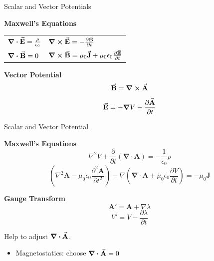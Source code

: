 \documentclass[9pt]{beamer}
\begin{document}
\begin{frame}{Scalar and Vector Potentials}
    \begin{beamerboxesrounded}[shadow=true]{\bf Maxwell's Equations}
        \begin{table}[htbp]
            \centering
            \begin{tabular}{ll}
            \addlinespace[1em]
            $\div{\va{E}} = \frac{\rho}{\epsilon_0}$ & $\curl{\va{E}}=-\pdv{\va{B}}{t}$ \\ \addlinespace[1em]
             $\div{\va{B}} = 0$ & $\curl{\va{B}}=\mu_0 \va{J}+ \mu_0 \epsilon_0 \pdv{\va{E}}{t}$ 
            \end{tabular}
        \end{table}
    \end{beamerboxesrounded}
    \vspace{.5em}
    \begin{beamerboxesrounded}[shadow=true]{\bf Vector Potential}
        \begin{equation}
            \va{B} = \curl \va{A}
        \end{equation}
        \begin{equation}
            \va{E} = -\grad V - \pdv{\va{A}}{t}
        \end{equation}
    \end{beamerboxesrounded}
\end{frame}

\begin{frame}{Scalar and Vector Potential}
    \begin{beamerboxesrounded}[shadow=true]{\bf Maxwell's Equations}
        \begin{equation}
            \nabla^{2} V+\frac{\partial}{\partial t}(\mathbf{\nabla} \cdot \mathbf{A})=-\frac{1}{\epsilon_{0}} \rho
        \end{equation}
        \begin{equation}
            \left(\nabla^{2} \mathbf{A}-\mu_{0} \epsilon_{0} \frac{\partial^{2} \mathbf{A}}{\partial t^{2}}\right)-\nabla\left(\mathbf{\nabla} \cdot \mathbf{A}+\mu_{0} \epsilon_{0} \frac{\partial V}{\partial t}\right)=-\mu_{0} \mathbf{J}
        \end{equation}
    \end{beamerboxesrounded}    
    \vspace{.5em}
    \begin{beamerboxesrounded}[shadow=true]{\bf Gauge Transform}
        \begin{equation}
            \mathbf{A}'=\mathbf{A}+\nabla \lambda
        \end{equation}     
        \begin{equation}
            V'=V-\frac{\partial \lambda}{\partial t}
        \end{equation}   

        Help to adjust $\div\va{A}$.
        \begin{itemize}
            \item Magnetostatics: choose $\div\va{A}=0$
        \end{itemize}
    \end{beamerboxesrounded}
\end{frame}
\end{document}
